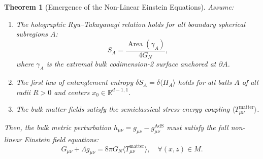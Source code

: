 \documentclass[11pt,a4paper,reqno]{amsart}
\newtheorem{theorem}{Theorem}[section]
\theoremstyle{definition}
\numberwithin{equation}{section}
\newcommand{\R}{\mathbb{R}}
\newcommand{\Area}{\operatorname{Area}}
\begin{document}
\begin{theorem}[Emergence of the Non-Linear Einstein Equations]
\label{thm:einstein_emergence}
Assume:
\begin{enumerate}[label=(\alph*)]
    \item The holographic Ryu--Takayanagi relation holds for all boundary spherical subregions $A$:
    \begin{equation}
        S_A = \frac{\Area(\gamma_A)}{4 G_N},
    \end{equation}
    where $\gamma_A$ is the extremal bulk codimension-2 surface anchored at $\partial A$.
    \item The first law of entanglement entropy $\delta S_A = \delta \langle H_A \rangle$ holds for all balls $A$ of all radii $R > 0$ and centers $x_0 \in \R^{d-1, 1}$.
    \item The bulk matter fields satisfy the semiclassical stress-energy coupling $\langle T_{\mu\nu}^{\mathrm{matter}} \rangle$.
\end{enumerate}
Then, the bulk metric perturbation $h_{\mu\nu} = g_{\mu\nu} - g_{\mu\nu}^{\mathrm{AdS}}$ must satisfy the full non-linear Einstein field equations:
\begin{equation}
    \label{eq:einstein_emergent}
    G_{\mu\nu} + \Lambda g_{\mu\nu} = 8\pi G_N \langle T_{\mu\nu}^{\mathrm{matter}} \rangle, \quad \forall (x, z) \in M.
\end{equation}
\end{theorem}
\end{document}
